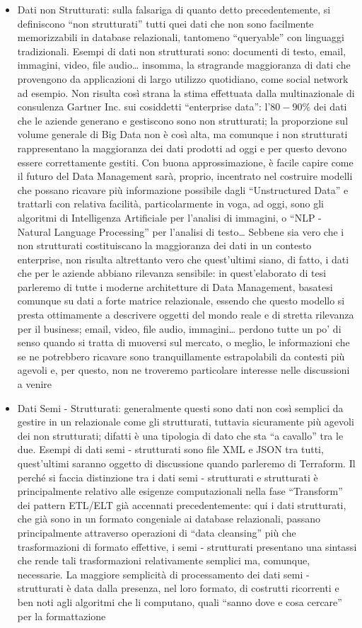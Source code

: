 \documentclass[a4paper,12pt]{report}
\begin{document}
\begin{itemize}
    \item Dati non Strutturati: sulla falsariga di quanto detto precedentemente, si definiscono “non strutturati” tutti quei dati che non sono facilmente memorizzabili in database relazionali, tantomeno “queryable” con linguaggi tradizionali. Esempi di dati non strutturati sono: documenti di testo, email, immagini, video, file audio… insomma, la stragrande maggioranza di dati che provengono da applicazioni di largo utilizzo quotidiano, come social network ad esempio. Non risulta così strana la stima effettuata dalla multinazionale di consulenza Gartner Inc. sui cosiddetti “enterprise data”: l’$80 - 90\%$ dei dati che le aziende generano e gestiscono sono non strutturati; la proporzione sul volume generale di Big Data non è così alta, ma comunque i non strutturati rappresentano la maggioranza dei dati prodotti ad oggi e per questo devono essere correttamente gestiti. Con buona approssimazione, è facile capire come il futuro del Data Management sarà, proprio, incentrato nel costruire modelli che possano ricavare più informazione possibile dagli “Unstructured Data” e trattarli con relativa facilità, particolarmente in voga, ad oggi, sono gli algoritmi di Intelligenza Artificiale per l’analisi di immagini, o “NLP - Natural Language Processing” per l’analisi di testo… Sebbene sia vero che i non strutturati costituiscano la maggioranza dei dati in un contesto enterprise, non risulta altrettanto vero che quest’ultimi siano, di fatto, i dati che per le aziende abbiano rilevanza sensibile: in quest’elaborato di tesi parleremo di tutte i moderne architetture di Data Management, basatesi comunque su dati a forte matrice relazionale, essendo che questo modello si presta ottimamente a descrivere oggetti del mondo reale e di stretta rilevanza per il business; email, video, file audio, immagini… perdono tutte un po’ di senso quando si tratta di muoversi sul mercato, o meglio, le informazioni che se ne potrebbero ricavare sono tranquillamente estrapolabili da contesti più agevoli e, per questo, non ne troveremo particolare interesse nelle discussioni a venire
    \item Dati Semi - Strutturati: generalmente questi sono dati non così semplici da gestire in un relazionale come gli strutturati, tuttavia sicuramente più agevoli dei non strutturati; difatti è una tipologia di dato che sta “a cavallo” tra le due. Esempi di dati semi - strutturati sono file XML e JSON tra tutti, quest’ultimi saranno oggetto di discussione quando parleremo di Terraform. Il perché si faccia distinzione tra i dati semi - strutturati e strutturati è principalmente relativo alle esigenze computazionali nella fase “Transform” dei pattern ETL/ELT già accennati precedentemente: qui i dati strutturati, che già sono in un formato congeniale ai database relazionali, passano principalmente attraverso operazioni di “data cleansing” più che trasformazioni di formato effettive, i semi - strutturati presentano una sintassi che rende tali trasformazioni relativamente semplici ma, comunque, necessarie. La maggiore semplicità di processamento dei dati semi - strutturati è data dalla presenza, nel loro formato, di costrutti ricorrenti e ben noti agli algoritmi che li computano, quali “sanno dove e cosa cercare” per la formattazione
\end{itemize}
\end{document}
